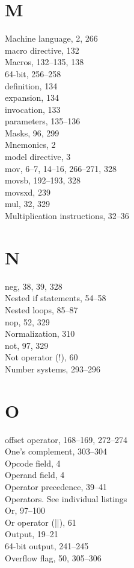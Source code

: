 \documentclass[10pt]{book}
\begin{document}
\section{M}
Machine language, 2, 266\\
macro directive, 132\\
Macros, 132--135, 138\\
64-bit, 256--258\\
definition, 134\\
expansion, 134\\
invocation, 133\\
parameters, 135--136\\
Masks, 96, 299\\
Mnemonics, 2\\
model directive, 3\\
mov, 6--7, 14--16, 266--271, 328\\
movsb, 192--193, 328\\
movsxd, 239\\
mul, 32, 329\\
Multiplication instructions, 32--36\\

\section{N}
neg, 38, 39, 328\\
Nested if statements, 54--58\\
Nested loops, 85--87\\
nop, 52, 329\\
Normalization, 310\\
not, 97, 329\\
Not operator (!), 60\\
Number systems, 293--296\\

\section{O}
offset operator, 168--169, 272--274\\
One's complement, 303--304\\
Opcode field, 4\\
Operand field, 4\\
Operator precedence, 39--41\\
Operators. See individual listings\\
Or, 97--100\\
Or operator (||), 61\\
Output, 19--21\\
64-bit output, 241--245\\
Overflow flag, 50, 305--306\\
\end{document}
